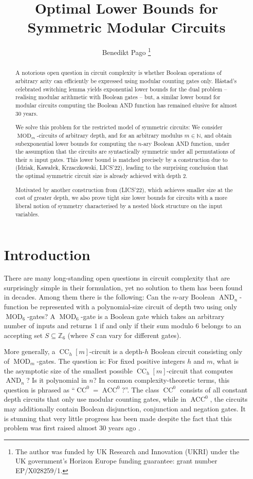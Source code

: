 \documentclass[11pt]{article}
\title{Optimal Lower Bounds for Symmetric Modular Circuits}
\author{Benedikt Pago \orcidlink{0000-0001-6377-1230} \thanks{The author was funded by UK Research and Innovation (UKRI) under the UK government’s Horizon Europe funding guarantee: grant number EP/X028259/1.}}
\affil{Department of Computer Science and Technology, University of Cambridge, UK}
\DeclareMathOperator{\MOD}{MOD}
\DeclareMathOperator{\AND}{AND}
\newcommand{\bbN}{\mathbb{N}}
\newcommand{\bbZ}{\mathbb{Z}}
\theoremstyle{definition}
\theoremstyle{plain}
\theoremstyle{remark}
\theoremstyle{remark}
\DeclareMathOperator{\CC}{CC}
\DeclareMathOperator{\ACC}{ACC}
\begin{document}
\maketitle

\begin{abstract}
	A notorious open question in circuit complexity is whether Boolean operations of arbitrary arity can efficiently be expressed using modular counting gates only. 
	H{\aa}stad's celebrated switching lemma yields exponential lower bounds for the dual problem -- realising modular arithmetic with Boolean gates -- but, a similar lower bound for modular circuits computing the Boolean AND function has remained elusive for almost 30 years. 
	
	We solve this problem for the restricted model of symmetric circuits: We consider $\MOD_m$-circuits of arbitrary depth, and for an arbitrary modulus $m \in \bbN$, and obtain subexponential lower bounds for computing the $n$-ary Boolean AND function, under the assumption that the circuits are syntactically symmetric under all permutations of their $n$ input gates. This lower bound is matched precisely by a construction due to (Idziak, Kawa\l ek, Krzaczkowski, LICS'22), leading to the surprising conclusion that the optimal symmetric circuit size is already achieved with depth $2$. 
	
	Motivated by another construction from (LICS'22), which achieves smaller size at the cost of greater depth, we also prove tight size lower bounds for circuits with a more liberal notion of symmetry characterised by a nested block structure on the input variables.
\end{abstract}	



\section{Introduction}
There are many long-standing open questions in circuit complexity that are surprisingly simple in their formulation, yet no solution to them has been found in decades.
Among them there is the following: Can the $n$-ary Boolean $\AND_n$-function be represented with a polynomial-size circuit of depth two using only $\MOD_6$-gates?
A $\MOD_6$-gate is a Boolean gate which takes an arbitrary number of inputs and returns $1$ if and only if their sum modulo $6$ belongs to an accepting set $S \subseteq \bbZ_6$ (where $S$ can vary for different gates). 

More generally, a $\CC_h[m]$-circuit is a depth-$h$ Boolean circuit consisting only of $\MOD_m$-gates. 
The question is: For fixed positive integers $h$ and $m$, what is the asymptotic size of the smallest possible $\CC_h[m]$-circuit that computes $\AND_n$? Is it polynomial in $n$?
In common complexity-theoretic terms, this question is phrased as ``$\CC^0 = \ACC^0$?''.
The class $\CC^0$ consists of all constant depth circuits that only use modular counting gates, while in $\ACC^0$, the circuits may additionally contain Boolean disjunction, conjunction and negation gates.
It is stunning that very little progress has been made despite the fact that this problem was first raised almost 30 years ago \cite{BarringtonST90}. 
\end{document}
